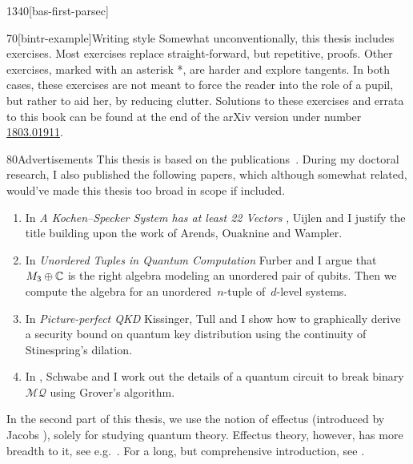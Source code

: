 \begin{parsec}{1340}[bas-first-parsec]
\begin{point}{70}[bintr-example]{Writing style}
Somewhat unconventionally, this thesis includes exercises.
Most exercises replace straight-forward, but repetitive, proofs.
Other exercises, marked with an asterisk *,
    are harder and explore tangents.
In both cases, these exercises are not meant to force the reader into the
    role of a pupil, but rather to aid her, by reducing clutter.
Solutions to these exercises and errata to this book
    can be found at the end of the arXiv version
    under number
    \href{https://arxiv.org/abs/1803.01911}{1803.01911}.
\end{point}
\begin{point}{80}{Advertisements}%
This thesis is based on the publications~\cite{wwpaschke,westerbaan2016universal,cho2015quotient,statesofconvexsets}.
During my doctoral research,
    I also published the following papers,
    which although somewhat related,
    would've made this thesis too broad in scope if included.
\begin{enumerate}
    \item In \emph{A Kochen--Specker System has at least 22 Vectors} \cite{uijlen2016kochen},
        Uijlen and I justify the title building upon the work
        of Arends, Ouaknine and Wampler.
\item 
    In \emph{Unordered Tuples in Quantum Computation} \cite{bags}
        Furber and I argue that~$M_3 \oplus \mathbb{C}$ is the right algebra
        modeling an unordered pair of qubits.  Then we compute
        the algebra for an unordered~$n$-tuple of~$d$-level systems.
\item
    In \emph{Picture-perfect QKD} \cite{kissinger2017picture}
        Kissinger, Tull and I show how to graphically derive a security
        bound on quantum key distribution using the continuity of Stinespring's dilation.
\item
    In \cite{schwabe2016solving}, Schwabe and I
            work out the details of a quantum circuit
            to break binary~$\mathcal{MQ}$ using Grover's algorithm.
\end{enumerate}
In the second part of this thesis,
    we
 use the notion of effectus (introduced by Jacobs \cite{newdirections}),
    solely for studying quantum theory.
Effectus theory, however, has more breadth to it,
 see e.g.~\cite{jacobs2017quantum,
cho2017disintegration,
adams2015type,
jacobs2016hyper,
jacobs2017channel,
jacobs2017formal,
cho2017efprob,
jacobs2017probability,
jacobs2017recipe,
jacobs2016effectuses,
jacobs2016affine,
jacobs2017distances,
jacobs2015effect}.
For a long, but comprehensive introduction, see \cite{effintro}.

\end{point}
\end{parsec}
